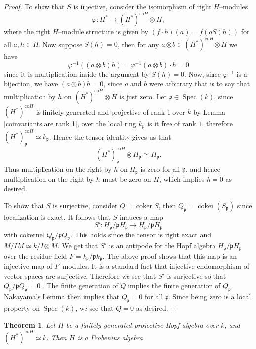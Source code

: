 \documentclass{article}
\theoremstyle{plain}
\newtheorem{Th}{Theorem}[section]
\theoremstyle{definition}
\DeclareMathOperator{\coker}{coker}
\DeclareMathOperator{\Spec}{Spec}
\newcommand{\mf}{\mathfrak}
\begin{document}
\begin{proof}
    To show that $S$ is injective, consider the isomorphism of right $H$--modules 
\[
\varphi\colon H^* \to (H^*)^{\text{co}H}\otimes H,
\]
 where the right $H$--module structure is given by $(f\cdot h)(a)=f(aS(h))$ for all $a, h\in H$. Now suppose $S(h)=0$, then for any $a\otimes b\in  (H^*)^{\text{co}H}\otimes H$ we have 
\[
\varphi^{-1}((a\otimes b)h)=\varphi^{-1}(a\otimes b) \cdot h = 0
\]
since it is multiplication inside the argument by $S(h)=0$. Now, since $\varphi^{-1}$ is a bijection, we have $(a\otimes b)h=0$, since $a$ and $b$ were arbitrary that is to say that multiplication by $h$ on  $(H^*)^{\text{co}H}\otimes H$ is just zero. Let $\mf{p}\in \Spec(k)$, since  $(H^*)^{\text{co}H}$ is finitely generated and projective of rank 1 over $k$ by Lemma \ref{coinvariants are rank 1}, over the local ring $k_\mf{p}$ is it free of rank $1$, therefore $(H^*)^{\text{co}H}_\mf{p}\simeq k_\mf{p}$. Hence the tensor identity gives us that 
\[
(H^*)^{\text{co}H}_\mf{p}\otimes H_\mf{p} \simeq H_\mf{p}. 
\]
Thus multiplication on the right by $h$ on $H_\mf{p}$ is zero for all $\mf{p}$, and hence multiplication on the right by $h$ must be zero on $H$, which implies $h=0$ as desired.

To show that $S$ is surjective, consider $Q=\coker S$, then $Q_\mf{p}=\coker(S_\mf{p})$ since localization is exact. It follows that $S$ induces a map 
\[
S'\colon H_\mf{p}/\mf{p}H_{\mf{p}}\to H_\mf{p}/\mf{p}H_{\mf{p}}
\]
with cokernel $Q_\mf{p}/\mf{p}Q_{\mf{p}}$. This holds since the tensor is right exact and $M/IM\simeq k/I \otimes M$.  We get that $S'$ is an antipode for the Hopf algebra $H_\mf{p}/\mf{p}H_{\mf{p}}$ over the residue field $F=k_\mf{p}/\mf{p}k_{\mf{p}}$. The above proof shows that this map is an injective map of $F$--modules. It is a standard fact that injective endomorphism of vector spaces are surjective. Therefore we see that $S'$ is surjective so that $Q_\mf{p}/\mf{p}Q_{\mf{p}}=0$ . The finite generation of $Q$ implies the finite generation of $Q_\mf{p}$. Nakayama's Lemma then implies that $Q_\mf{p}=0$ for all $\mf{p}$. Since being zero is a local property on $\Spec(k)$, we see that $Q=0$ as desired.
\end{proof}

\begin{Th}\label{some Hopf algebras are Frobenius}
    Let $H$ be a finitely generated projective Hopf algebra over $k$, and $(H^*)^{\text{co}H} \simeq k$. Then $H$ is a Frobenius algebra.
\end{Th}
\end{document}
